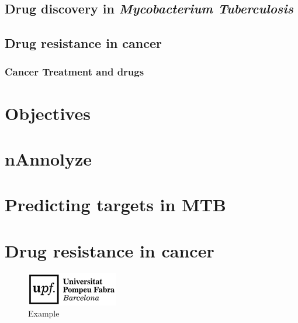 \documentclass[12pt, a4paper,twoside]{tesi_upf}
\begin{document}
\section{Drug discovery in \textit{Mycobacterium Tuberculosis}}

\par 

\section{Drug resistance in cancer}
\subsection{Cancer Treatment and drugs}





\chapter{Objectives}
\chapter{nAnnolyze}
\chapter{Predicting targets in MTB}
\chapter{Drug resistance in cancer}



\begin{figure}[b]
  \centering
  \includegraphics[scale=0.5]{../figures/logo_upf.png}
    \caption{Example}
    \label{fig:logo}
\end{figure}





%



\backmatter
\printindex

\printbibliography
\end{document}
